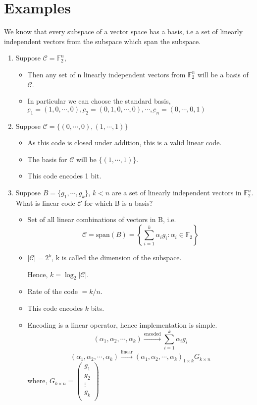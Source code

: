 \documentclass{article}
\begin{document}
\section{Examples}
We know that every subspace of a vector space has a basis, i.e a set of linearly independent vectors from the subspace which span the subspace.
\\
\begin{enumerate}
    \item Suppose $\mathscr{C}= \mathbb{F}_2^n$,
    \begin{itemize}
        \item Then any set of n linearly independent vectors from $\mathbb{F}_2^n$ will be a basis of $\mathscr{C}$.
        \item In particular we can choose the standard basis, $\underbar{c}_1= (1,0,\cdots,0),\underbar{c}_2= (0,1,0,\cdots,0),\cdots, \underbar{c}_n=(0,\cdots,0,1)$
    \end{itemize}
    \item Suppose $\mathscr{C}= \{ (0, \cdots,0), (1,\cdots,1)\}$
    \begin{itemize}
        \item As this code is closed under addition, this is a valid linear code.
        \item The basis for $\mathscr{C}$ will be $\{ (1,\cdots,1)\}$.
        \item This code encodes 1 bit.
    \end{itemize}
    \item Suppose $B= \{ g_1,\cdots, g_k \}$, $k<n$ are a set of linearly independent vectors in $\mathbb{F}_2^n$. What is linear code $\mathscr{C}$ for which B is a basis?
    \begin{itemize}
        \item Set of all linear combinations of vectors in B, i.e. $$ \mathscr{C}= \text{span}(B) = \left\{ \sum_{i=1}^{k} \alpha_i g_i: \alpha_i \in \mathbb{F}_2 \right\}$$
        \item $ |\mathscr{C}|= 2^k$, k is called the dimension of the subspace.

         Hence, $k= \log_2 |\mathscr{C}| $.
         \item Rate of  the code $= k/n $.
         \item This code encodes $k$ bits.
         \item Encoding is a linear operator, hence implementation is simple. $$ ( \alpha_1 , \alpha_2, \cdots, \alpha_k ) \xrightarrow{\text{encoded}} \sum_{i=1}^{k} \alpha_i g_i$$
         $$ ( \alpha_1 , \alpha_2, \cdots, \alpha_k ) \xrightarrow{\text{linear}} ( \alpha_1 , \alpha_2, \cdots, \alpha_k )_{1\times k} G_{k \times n}$$
         where,
         $ G_{k \times n}=
\begin{pmatrix}
  g_1 \\
  g_2 \\
  \vdots \\
  g_k \\
\end{pmatrix}$
    \end{itemize}

\end{enumerate}
\end{document}

